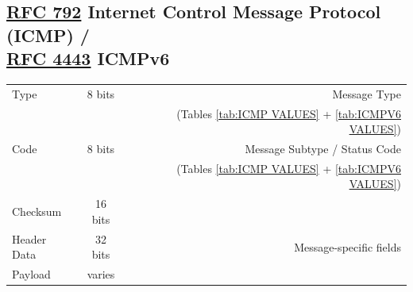 \documentclass[12pt]{article}
\newcommand{\RFC}[1]{\href{https://datatracker.ietf.org/doc/html/rfc#1}{RFC #1}}
\begin{document}
	\subsection[RFC 792 ICMP / RFC 4443 ICMPv6]{\RFC{792} Internet Control Message Protocol (ICMP) /\\\RFC{4443} ICMPv6 \label{subsec:ICMP}}
	\begin{table}[H]
	\centering
	\begin{tabular}{| l | c | r |}
	\hline
	Type			& 8 bits	& Message Type\\
				&		& (Tables \ref{tab:ICMP VALUES} + \ref{tab:ICMPV6 VALUES}) \\\hline
	Code			& 8 bits	& Message Subtype / Status Code\\
				&		& (Tables \ref{tab:ICMP VALUES} + \ref{tab:ICMPV6 VALUES})\\\hline
	Checksum		& 16 bits	&\\\hline
	Header Data	& 32 bits	& Message-specific fields\\\hline
	Payload		& varies	&\\\hline
	\end{tabular}\end{table}
\end{document}
